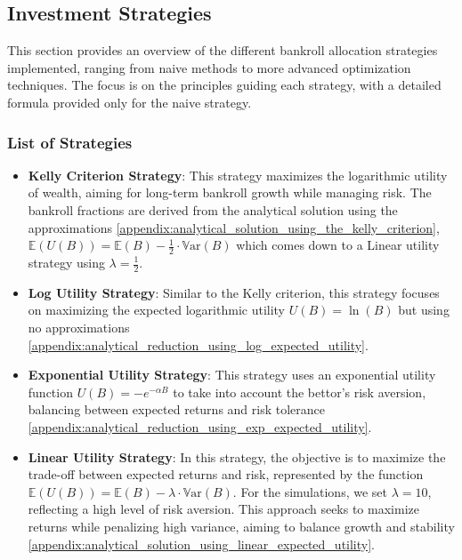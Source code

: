 \subsection{Investment Strategies}

This section provides an overview of the different bankroll allocation strategies implemented, ranging from naive methods to more advanced optimization techniques. The focus is on the principles guiding each strategy, with a detailed formula provided only for the naive strategy.

\subsubsection{List of Strategies}

\begin{itemize}
    \item \textbf{Kelly Criterion Strategy}: \cite{Kelly1956} \cite{Thorp1969}  
    This strategy maximizes the logarithmic utility of wealth, aiming for long-term bankroll growth while managing risk. The bankroll fractions are derived from the analytical solution using the approximations  \ref{appendix:analytical_solution_using_the_kelly_criterion}, \(\mathbb{E}(U(B)) = \mathbb{E}(B) - \frac{1}{2} \cdot \mathbb{V}\text{ar}(B) \) which comes down to a Linear utility strategy using \( \lambda = \frac{1}{2} \).

    \item \textbf{Log Utility Strategy}:  
    Similar to the Kelly criterion, this strategy focuses on maximizing the expected logarithmic utility \(U(B) = \ln(B)\)  but using no approximations \ref{appendix:analytical_reduction_using_log_expected_utility}.

    \item \textbf{Exponential Utility Strategy}:  
    This strategy uses an exponential utility function \(U(B) = -e^{-\alpha B}\) to take into account the bettor’s risk aversion, balancing between expected returns and risk tolerance \ref{appendix:analytical_reduction_using_exp_expected_utility}.

    \item \textbf{Linear Utility Strategy}:
    In this strategy, the objective is to maximize the trade-off between expected returns and risk, represented by the function \(\mathbb{E}(U(B)) = \mathbb{E}(B) - \lambda \cdot \mathbb{V}\text{ar}(B) \). For the simulations, we set \( \lambda = 10 \), reflecting a high level of risk aversion. This approach seeks to maximize returns while penalizing high variance, aiming to balance growth and stability \ref{appendix:analytical_solution_using_linear_expected_utility}. 


\end{itemize}
